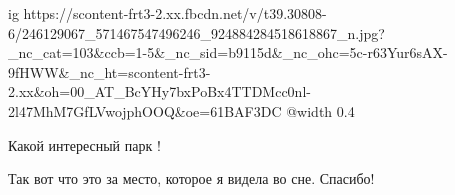 
 
 
 
 

\ifcmt
  ig https://scontent-frt3-2.xx.fbcdn.net/v/t39.30808-6/246129067_571467547496246_924884284518618867_n.jpg?_nc_cat=103&ccb=1-5&_nc_sid=b9115d&_nc_ohc=5c-r63Yur6sAX-9fHWW&_nc_ht=scontent-frt3-2.xx&oh=00_AT_BcYHy7bxPoBx4TTDMcc0nl-2l47MhM7GfLVwojphOOQ&oe=61BAF3DC
  @width 0.4
\fi


Какой интересный парк !

Так вот что это за место, которое я видела во сне. Спасибо!
